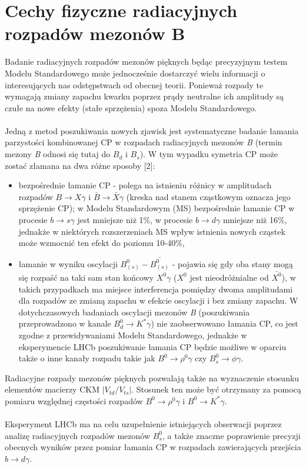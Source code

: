 \documentclass{pracamgr}
\begin{document}
\section{Cechy fizyczne radiacyjnych rozpadów mezonów B}

Badanie radiacyjnych rozpadów mezonów pięknych będąc precyzyjnym testem Modelu Standardowego może jednocześnie dostarczyć wielu informacji o interesujących nas odstępstwach od obecnej teorii. Ponieważ rozpady te wymagają zmiany zapachu kwarku poprzez prądy neutralne ich amplitudy są czułe na nowe efekty (stałe sprzężenia) spoza Modelu Standardowego.
\\\\
\noindent
Jedną z metod poszukiwania nowych zjawisk jest systematyczne badanie łamania parzystości kombinowanej CP w rozpadach radiacyjnych mezonów \textit{B} (termin mezony \textit{B} odnosi się tutaj do $B_d$ i $B_s$). W tym wypadku symetria CP może zostać złamana na dwa różne sposoby [2]:
\begin{itemize}
 \item bezpośrednie łamanie CP - polega na istnieniu różnicy w amplitudach rozpadów $B\rightarrow X \gamma$ i $\bar{B}\rightarrow \bar{X}\gamma$ (kreska nad stanem cząstkowym oznacza jego sprzężenie CP); w Modelu Standardowym (MS) bezpośrednie łamanie CP w procesie $b\rightarrow s\gamma$ jest mniejsze niż 1\%, w procesie $b\rightarrow d\gamma$ mniejsze niż 16\%, jednakże w niektórych rozszerzeniach MS wpływ istnienia nowych cząstek może wzmocnić ten efekt do poziomu 10-40\%,
 \item łamanie w wyniku oscylacji $B^{0}_{(s)}-\bar{B^{0}_{(s)}}$ - pojawia się gdy oba stany mogą się rozpaść na taki sam stan końcowy $X^{0}\gamma$ ($X^{0}$ jest nieodróżnialne od $\bar{X^{0}}$), w takich przypadkach ma miejsce interferencja pomiędzy dwoma amplitudami dla rozpadów ze zmianą zapachu w efekcie oscylacji i bez zmiany zapachu. W dotychczasowych badaniach oscylacji mezonów \textit{B} (poszukiwania przeprowadzono w kanale $B^{0}_{d}\rightarrow K^{*}\gamma$) nie zaobserwowano łamania CP, co jest zgodne z przewidywaniami Modelu Standardowego, jednakże w eksperymencie LHCb poszukiwanie łamania CP będzie możliwe w oparciu także o inne kanały rozpadu takie jak $B^{0}\rightarrow \rho^{0}\gamma$ czy $B^{0}_{s}\rightarrow \phi\gamma$.
\end{itemize}
\noindent
Radiacyjne rozpady mezonów pięknych pozwalają także na wyznaczenie stosunku elementów macierzy CKM $|V_{td}/V_{ts}|$. Stosunek ten może być otrzymany za pomocą pomiaru względnej częstości rozpadów 
 $B^{0}\rightarrow \rho^{0}\gamma$ i $B^{0}\rightarrow K^{*}\gamma$.
\\\\
\noindent
Eksperyment LHCb ma na celu uzupełnienie istniejących obserwacji poprzez analizę radiacyjnych rozpadów mezonów $B^{0}_{s}$, a także znaczne poprawienie precyzji obecnych wyników przez pomiar łamania CP w rozpadach zawierających przejścia $b\rightarrow d\gamma$.
\end{document}
